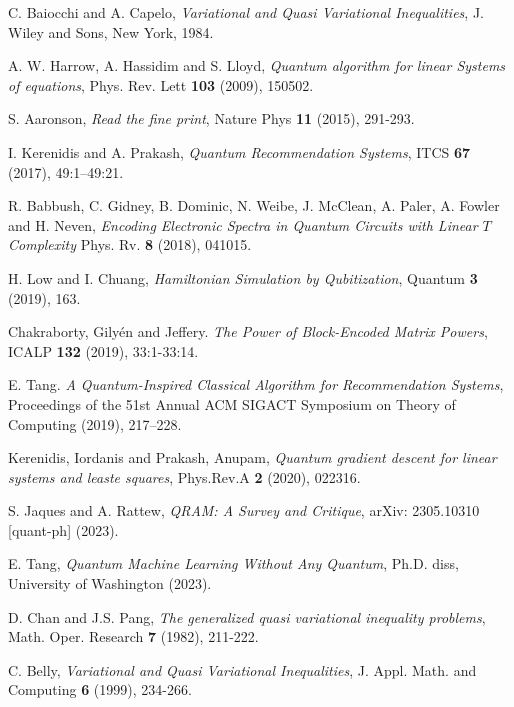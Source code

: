 \documentclass[10pt,twoside,reqno]{amsart} %
\theoremstyle{plain}
\theoremstyle{definition}
\begin{document}
\begin{thebibliography}{0}

C. Baiocchi and A. Capelo, 
{\it Variational and Quasi Variational Inequalities}, 
J. Wiley and Sons, 
New York, 
1984.

A. W. Harrow, A. Hassidim and S. Lloyd,
{\it Quantum algorithm for linear Systems of equations},
Phys. Rev. Lett
{\bf 103} (2009),
150502.

S. Aaronson,
{\it Read the fine print},
Nature Phys
{\bf 11} (2015),
291-293.

I. Kerenidis and A. Prakash,
{\it Quantum Recommendation Systems},
ITCS
{\bf 67} (2017),
49:1--49:21.

R. Babbush, C. Gidney, B. Dominic, N. Weibe, J. McClean, A. Paler, A. Fowler
and H. Neven,
{\it Encoding Electronic Spectra in Quantum Circuits with Linear $T$ Complexity}
Phys. Rv.
{\bf 8} (2018),
041015.

H. Low and I. Chuang,
{\it Hamiltonian Simulation by Qubitization},
Quantum
{\bf 3} (2019),
163.

Chakraborty, Gily{\'en} and Jeffery. {\it The Power of Block-Encoded Matrix
Powers}, ICALP {\bf 132} (2019), 33:1-33:14.

E. Tang. {\it A Quantum-Inspired Classical Algorithm for Recommendation Systems},
Proceedings of the 51st Annual ACM SIGACT Symposium on Theory of Computing (2019),
217--228.

Kerenidis, Iordanis and Prakash, Anupam, 
{\it Quantum gradient descent for linear systems and leaste squares}, 
Phys.Rev.A {\bf 2} (2020), 
022316.

S. Jaques and A. Rattew,
{\it QRAM: A Survey and Critique},
arXiv: 2305.10310 [quant-ph] (2023).

E. Tang,
{\it Quantum Machine Learning Without Any Quantum},
Ph.D. diss, University of Washington (2023).

D. Chan and J.S. Pang, 
{\it The generalized quasi variational inequality problems}, 
Math. Oper. Research 
{\bf 7} (1982), 
211-222.

C. Belly, 
{\it Variational and Quasi Variational Inequalities}, 
J. Appl. Math. and Computing 
{\bf 6} (1999), 
234-266.


\end{thebibliography}
\end{document}
